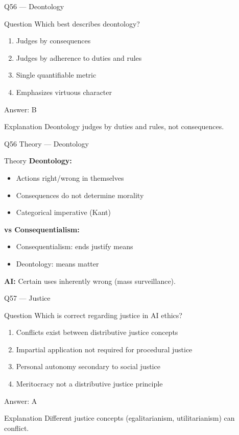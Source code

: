 \documentclass[aspectratio=169,8pt]{beamer}
\begin{document}
	\begin{frame}{Q56 --- Deontology}
		\begin{block}{Question}
			Which best describes deontology?
		\end{block}
		\begin{enumerate}[label=\Alph*.]
			\item Judges by consequences
			\item Judges by adherence to duties and rules
			\item Single quantifiable metric
			\item Emphasizes virtuous character
		\end{enumerate}
		\begin{exampleblock}{Answer: B}
		\end{exampleblock}
		\begin{block}{Explanation}
			Deontology judges by duties and rules, not consequences.
		\end{block}
	\end{frame}
	
	\begin{frame}{Q56 Theory --- Deontology}
		\begin{block}{Theory}
			\textbf{Deontology:}
			\begin{itemize}
				\item Actions right/wrong in themselves
				\item Consequences do not determine morality
				\item Categorical imperative (Kant)
			\end{itemize}
			\textbf{vs Consequentialism:}
			\begin{itemize}
				\item Consequentialism: ends justify means
				\item Deontology: means matter
			\end{itemize}
			\textbf{AI:} Certain uses inherently wrong (mass surveillance).
		\end{block}
	\end{frame}
	
	\begin{frame}{Q57 --- Justice}
		\begin{block}{Question}
			Which is correct regarding justice in AI ethics?
		\end{block}
		\begin{enumerate}[label=\Alph*.]
			\item Conflicts exist between distributive justice concepts
			\item Impartial application not required for procedural justice
			\item Personal autonomy secondary to social justice
			\item Meritocracy not a distributive justice principle
		\end{enumerate}
		\begin{exampleblock}{Answer: A}
		\end{exampleblock}
		\begin{block}{Explanation}
			Different justice concepts (egalitarianism, utilitarianism) can conflict.
		\end{block}
	\end{frame}
	
\end{document}
